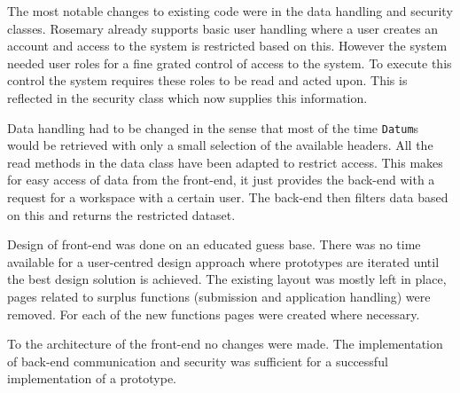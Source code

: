 The most notable changes to existing code were in the data handling and security classes.
Rosemary already supports basic user handling where a user creates an account and access to the system is restricted based on this.
However the system needed user roles for a fine grated control of access to the system.
To execute this control the system requires these roles to be read and acted upon.
This is reflected in the security class which now supplies this information.

Data handling had to be changed in the sense that most of the time {\tt Datum}s would be retrieved with only a small selection of the available headers.
All the read methods in the data class have been adapted to restrict access.
This makes for easy access of data from the front-end, it just provides the back-end with a request for a workspace with a certain user.
The back-end then filters data based on this and returns the restricted dataset.

Design of front-end was done on an educated guess base.
There was no time available for a user-centred design approach where prototypes are iterated until the best design solution is achieved.
The existing layout was mostly left in place, pages related to surplus functions (submission and application handling) were removed.
For each of the new functions pages were created where necessary.

To the architecture of the front-end no changes were made.
The implementation of back-end communication and security was sufficient for a successful implementation of a prototype.